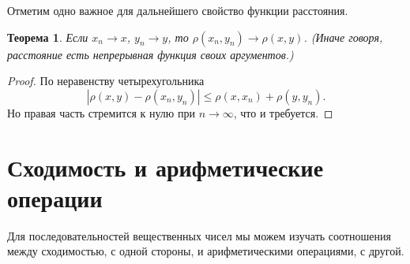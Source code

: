 \documentclass{article}
\newtheorem{theorem}{Теорема}[section]
\begin{document}
Отметим одно важное для дальнейшего свойство функции расстояния.

\begin{theorem}
Если \(x_n \to x\), \(y_n \to y\), то \(\rho(x_n, y_n) \to \rho(x, y)\). (Иначе говоря, расстояние есть непрерывная функция своих аргументов.)
\end{theorem}

\begin{proof}
По неравенству четырехугольника
\[
|\rho(x, y) - \rho(x_n, y_n)| \leq \rho(x, x_n) + \rho(y, y_n).
\]
Но правая часть стремится к нулю при \(n \to \infty\), что и требуется.
\end{proof}

\section{Сходимость и арифметические операции}

Для последовательностей вещественных чисел мы можем изучать соотношения между сходимостью, с одной стороны, и арифметическими операциями, с другой.
\end{document}
